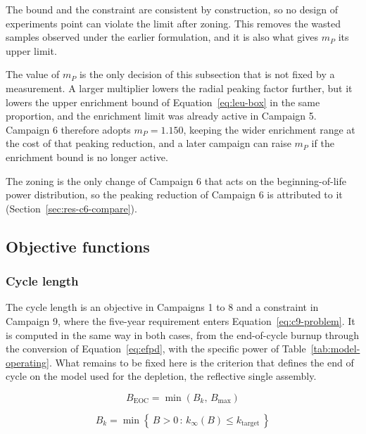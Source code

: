 The bound and the constraint are consistent by construction, so no
design of experiments point can violate the limit after zoning. This
removes the wasted samples observed under the earlier formulation, and
it is also what gives $m_P$ its upper limit.

The value of $m_P$ is the only decision of this subsection that is not
fixed by a measurement. A larger multiplier lowers the radial peaking
factor further, but it lowers the upper enrichment bound of
Equation~\eqref{eq:leu-box} in the same proportion, and the enrichment
limit was already active in Campaign 5. Campaign 6 therefore adopts
$m_P = 1.150$, keeping the wider enrichment range at the cost of that
peaking reduction, and a later campaign can raise $m_P$ if the
enrichment bound is no longer active.

The zoning is the only change of Campaign 6 that acts on the
beginning-of-life power distribution, so the peaking reduction of
Campaign 6 is attributed to it (Section~\ref{sec:res-c6-compare}).

\subsection{Objective functions}
\label{sec:objective_functions}

\subsubsection{Cycle length}
\label{sec:meth-cycle-length}

The cycle length is an objective in Campaigns 1 to 8 and a constraint in
Campaign 9, where the five-year requirement enters
Equation~\eqref{eq:c9-problem}. It is computed in the same way in both
cases, from the end-of-cycle burnup through the conversion of
Equation~\eqref{eq:efpd}, with the specific power of
Table~\ref{tab:model-operating}. What remains to be fixed here is the
criterion that defines the end of cycle on the model used for the
depletion, the reflective single assembly.

\begin{equation}
B_\mathrm{EOC} = \min\!\left( B_k,\, B_\mathrm{max} \right)
\label{eq:eoc}
\end{equation}

\begin{equation}
B_k = \min\left\{\, B > 0 \,:\, k_\infty(B) \le k_\mathrm{target} \,\right\}
\label{eq:eoc-k}
\end{equation}

